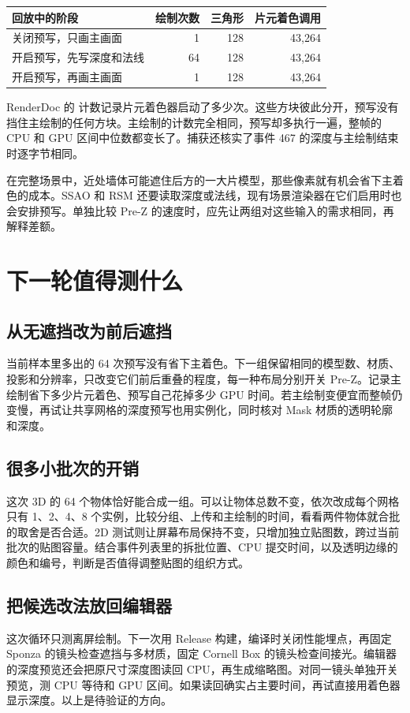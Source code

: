 {\smalltable\begin{tabularx}{\linewidth}{@{}Xrrr@{}}\toprule
回放中的阶段 & 绘制次数 & 三角形 & 片元着色调用 \\\midrule
关闭预写，只画主画面 & 1 & 128 & 43,264\\
开启预写，先写深度和法线 & 64 & 128 & 43,264\\
开启预写，再画主画面 & 1 & 128 & 43,264\\\bottomrule
\end{tabularx}\par}
RenderDoc 的  计数记录片元着色器启动了多少次。这些方块彼此分开，预写没有挡住主绘制的任何方块。主绘制的计数完全相同，预写却多执行一遍，整帧的 CPU 和 GPU 区间中位数都变长了。捕获还核实了事件 467 的深度与主绘制结束时逐字节相同。

在完整场景中，近处墙体可能遮住后方的一大片模型，那些像素就有机会省下主着色的成本。SSAO 和 RSM 还要读取深度或法线，现有场景渲染器在它们启用时也会安排预写。单独比较 Pre-Z 的速度时，应先让两组对这些输入的需求相同，再解释差额。

\newpage
\section{下一轮值得测什么}
\subsection{从无遮挡改为前后遮挡}
当前样本里多出的 64 次预写没有省下主着色。下一组保留相同的模型数、材质、投影和分辨率，只改变它们前后重叠的程度，每一种布局分别开关 Pre-Z。记录主绘制省下多少片元着色、预写自己花掉多少 GPU 时间。若主绘制变便宜而整帧仍变慢，再试让共享网格的深度预写也用实例化，同时核对 Mask 材质的透明轮廓和深度。

\subsection{很多小批次的开销}
这次 3D 的 64 个物体恰好能合成一组。可以让物体总数不变，依次改成每个网格只有 1、2、4、8 个实例，比较分组、上传和主绘制的时间，看看两件物体就合批的取舍是否合适。2D 测试则让屏幕布局保持不变，只增加独立贴图数，跨过当前批次的贴图容量。结合事件列表里的拆批位置、CPU 提交时间，以及透明边缘的颜色和编号，判断是否值得调整贴图的组织方式。

\subsection{把候选改法放回编辑器}
这次循环只测离屏绘制。下一次用 Release 构建，编译时关闭性能埋点，再固定 Sponza 的镜头检查遮挡与多材质，固定 Cornell Box 的镜头检查间接光。编辑器的深度预览还会把原尺寸深度图读回 CPU，再生成缩略图。对同一镜头单独开关预览，测 CPU 等待和 GPU 区间。如果读回确实占主要时间，再试直接用着色器显示深度。以上是待验证的方向。

